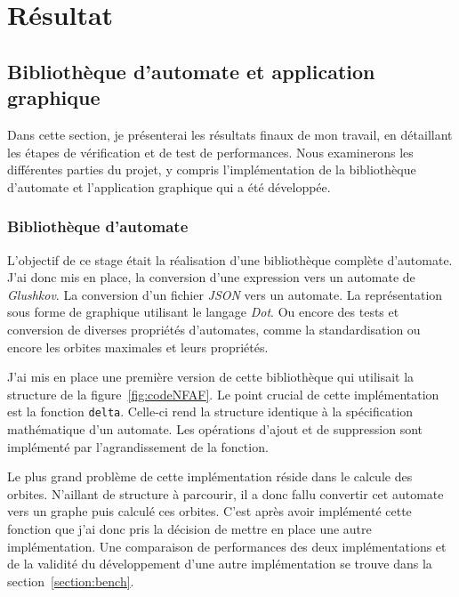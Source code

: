\section{Résultat}

\subsection{Bibliothèque d'automate et application graphique}

Dans cette section, je présenterai les résultats finaux de mon travail, en 
détaillant les étapes de vérification et de test de performances. Nous 
examinerons les différentes parties du projet, y compris l'implémentation de la 
bibliothèque d'automate et l'application graphique qui a été développée.

\subsubsection{Bibliothèque d'automate}

L'objectif de ce stage était la réalisation d'une bibliothèque complète 
d'automate. J'ai donc mis en place, la conversion d'une expression vers un 
automate de \textit{Glushkov}. La conversion d'un fichier \textit{JSON} vers un 
automate. La représentation sous forme de graphique utilisant le langage 
\textit{Dot}. Ou encore des tests et conversion de diverses propriétés 
d'automates, comme la standardisation ou encore les orbites maximales et leurs 
propriétés.

\vphantom{}

J'ai mis en place une première version de cette bibliothèque qui utilisait la 
structure de la figure~\ref{fig:codeNFAF}. Le point crucial de cette 
implémentation est la fonction \texttt{delta}. Celle-ci rend la 
structure identique à la spécification mathématique d'un automate. Les 
opérations d'ajout et de suppression sont implémenté par l'agrandissement de 
la fonction.

\vphantom{}

Le plus grand problème de cette implémentation réside dans le calcule des 
orbites. N'aillant de structure à parcourir, il a donc fallu convertir cet 
automate vers un graphe puis calculé ces orbites. C'est après avoir implémenté
cette fonction que j'ai donc pris la décision de mettre en place une autre 
implémentation. Une comparaison de performances des deux implémentations et de 
la validité du développement d'une autre implémentation se trouve dans la 
section~\ref{section:bench}.

